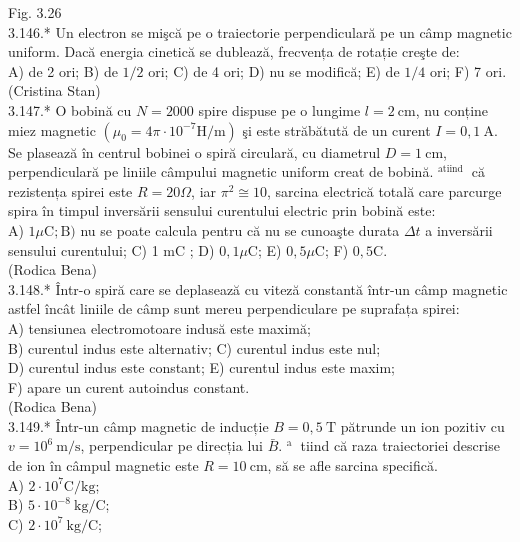 \documentclass[10pt]{article}
\begin{document}
Fig. 3.26\\
3.146.* Un electron se mişcă pe o traiectorie perpendiculară pe un câmp magnetic uniform. Dacă energia cinetică se dublează, frecvența de rotație creşte de:\\
A) de 2 ori; B) de $1 / 2$ ori; C) de 4 ori; D) nu se modifică; E) de $1 / 4$ ori; F) 7 ori.\\
(Cristina Stan)\\
3.147.* O bobină cu $N=2000$ spire dispuse pe o lungime $l=2 \mathrm{~cm}$, nu conține miez magnetic $\left(\mu_{0}=4 \pi \cdot 10^{-7} \mathrm{H} / \mathrm{m}\right)$ şi este străbătută de un curent $I=0,1 \mathrm{~A}$. Se plasează în centrul bobinei o spiră circulară, cu diametrul $D=1 \mathrm{~cm}$, perpendiculară pe liniile câmpului magnetic uniform creat de bobină. ${ }^{\text {atiind }}$ că rezistența spirei este $R=20 \Omega$, iar $\pi^{2} \cong 10$, sarcina electrică totală care parcurge spira în timpul inversării sensului curentului electric prin bobină este:\\
A) $1 \mu \mathrm{C} ; \mathrm{B})$ nu se poate calcula pentru că nu se cunoaşte durata $\Delta t$ a inversării sensului curentului; C) 1 mC ; D) $0,1 \mu \mathrm{C}$; E) $0,5 \mu \mathrm{C}$; F) $0,5 \mathrm{C}$.\\
(Rodica Bena)\\
3.148.* Într-o spiră care se deplasează cu viteză constantă într-un câmp magnetic astfel încât liniile de câmp sunt mereu perpendiculare pe suprafața spirei:\\
A) tensiunea electromotoare indusă este maximă;\\
B) curentul indus este alternativ; C) curentul indus este nul;\\
D) curentul indus este constant; E) curentul indus este maxim;\\
F) apare un curent autoindus constant.\\
(Rodica Bena)\\
3.149.* Într-un câmp magnetic de inducție $B=0,5 \mathrm{~T}$ pătrunde un ion pozitiv cu $v=10^{6} \mathrm{~m} / \mathrm{s}$, perpendicular pe direcția lui $\bar{B}$. ${ }^{\text {a }}$ tiind că raza traiectoriei descrise de ion în câmpul magnetic este $R=10 \mathrm{~cm}$, să se afle sarcina specifică.\\
A) $2 \cdot 10^{7} \mathrm{C} / \mathrm{kg}$;\\
B) $5 \cdot 10^{-8} \mathrm{~kg} / \mathrm{C}$;\\
C) $2 \cdot 10^{7} \mathrm{~kg} / \mathrm{C}$;\\
\end{document}
